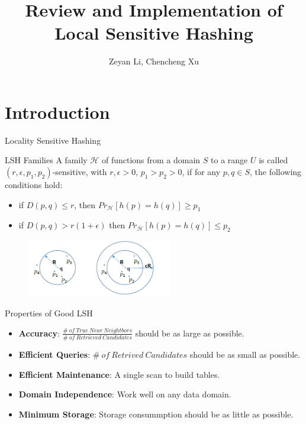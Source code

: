 \documentclass{beamer}
\title{Review and Implementation of Local Sensitive Hashing}
\author{Zeyan Li, Chencheng Xu}
\begin{document}
	\maketitle
	\section{Introduction}
	\begin{frame}{Locality Sensitive Hashing}
	\begin{block}{LSH Families}
		A family $\mathcal{H}$ of functions from a domain $S$ to a range $U$ is called $(r, \epsilon, p_1, p_2)$-sensitive, with $r, \epsilon>0$, $p_1>p_2>0$, if for any $p, q\in S$, the following conditions hold:
		\begin{itemize}
			\item if $D(p, q)\leq r$, then $Pr_{\mathcal{H}}[h(p)=h(q)]\geq p_1$
			\item if $D(p, q)>r(1+\epsilon)$ then $Pr_{\mathcal{H}}[h(p)=h(q)]\leq p_2$
		\end{itemize}
	\end{block}
	\begin{figure}
		\includegraphics[width=2.5in]{figures/intro_lsh.png}
	\end{figure}
	\end{frame}
	
	\begin{frame}{Properties of Good LSH}
	\small
		\begin{itemize}
			\item \textbf{Accuracy}: $\frac{\#\ of\ True\ Near\ Neightbors}{\#\ of\ Retrieved\ Candidates}$ should be as large as possible.
			\vspace{2ex}
			\item\textbf{Efficient Queries}: \small{$\#\ of\ Retrived\ Candidates$} should be as small as possible.
			\vspace{2ex}
			\item \textbf{Efficient Maintenance}: A single scan to build tables.
			\vspace{2ex}
			\item \textbf{Domain Independence}: Work well on any data domain.
			\vspace{2ex}
			\item \textbf{Minimum Storage}: Storage consummption should be as little as possible.
		\end{itemize}
	\end{frame}
\end{document}
